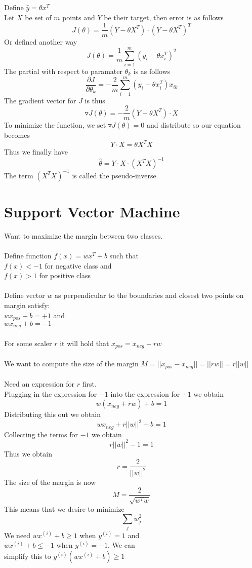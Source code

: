 \documentclass[twoside,11pt]{article}
\theoremstyle{definition}
\begin{document}
Define $\hat{y} = \theta x^T$\\
Let $X$ be set of $m$ points and $Y$ be their target, then error is as follows
\[
J(\theta) = \frac{1}{m} (Y - \theta X^T) \cdot (Y- \theta X^T)^T
\]
Or defined another way
\[
J(\theta) = \frac{1}{m} \sum_{i=1}^m (y_i - \theta x_i^T)^2
\]
The partial with respect to paramater $\theta_k$ is as follows
\[
\frac{\partial J}{\partial \theta_k} = -\frac{2}{m} \sum_{i=1}^m (y_i - \theta x_i^T)x_{ik}
\]
The gradient vector for $J$ is thus
\[
\triangledown J(\theta) = -\frac{2}{m} (Y-\theta X^T) \cdot X
\]
To minimize the function, we set $\triangledown J(\theta) = 0$ and distribute so our equation becomes
\[
Y \cdot X = \theta X^T X
\]
Thus we finally have
\[
\hat{\theta} = Y \cdot X \cdot (X^T X)^{-1}
\]
The term $(X^T X)^{-1}$ is called the pseudo-inverse

\newpage

\section{Support Vector Machine}

Want to maximize the margin between two classes. \\
\\
Define function $f(x) = wx^T + b$ such that \\
$f(x)<-1$ for negative class and \\
$f(x)>1$ for positive class\\
\\
Define vector $w$ as perpendicular to the boundaries and closest two points on margin satisfy: \\
$w x_{pos} + b= +1$ and \\
$w x_{neg} + b = -1$\\
\\
For some scaler $r$ it will hold that $x_{pos} = x_{neg} + rw$\\
\\
We want to compute the size of the margin $M=||x_{pos}-x_{neg}|| = ||rw|| = r||w||$\\
\\
Need an expression for $r$ first.\\
Plugging in the expression for $-1$ into the expression for $+1$ we obtain
\[
w(x_{neg} + rw) + b = 1
\] 
Distributing this out we obtain
\[
w x_{neg} + r ||w||^2 + b = 1
\]
Collecting the terms for $-1$ we obtain
\[
r ||w||^2 - 1 = 1
\]
Thus we obtain
\[
r = \frac{2}{||w||^2}
\]
The size of the margin is now
\[
M = \frac{2}{\sqrt{w^Tw}}
\]
This means that we desire to minimize
\[
\sum_{j} w_j^2
\]
We need $w x^{(i)} + b \geq 1$ when $y^{(i)}=1$ and \\
$w x^{(i)} + b \leq -1$ when $y^{(i)}=-1$. We can\\
simplify this to $y^{(i)} (w x^{(i)} + b) \geq 1$
\end{document}
